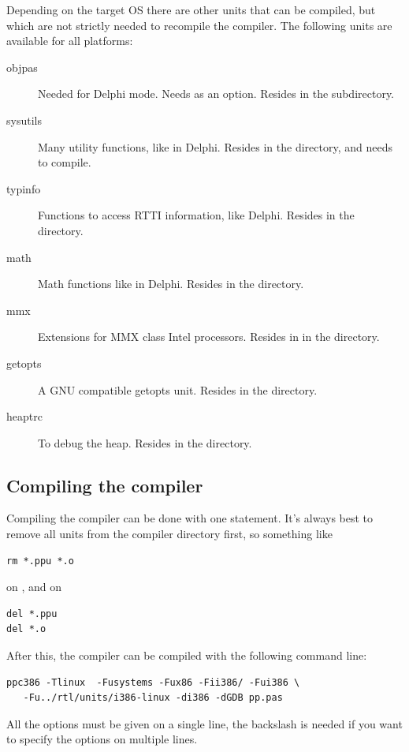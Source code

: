 Depending on the target OS there are other units that can be 
compiled, but which are not strictly needed to recompile the compiler.
The following units are available for all platforms:
\begin{description}
\item[objpas] Needed for Delphi mode. Needs  as an option. Resides
in the  subdirectory.
\item[sysutils] Many utility functions, like in Delphi. Resides in the
 directory, and needs  to compile.
\item[typinfo] Functions to access RTTI information, like Delphi. Resides in
the  directory.
\item[math] Math functions like in Delphi. Resides in the 
directory.
\item[mmx] Extensions for MMX class Intel processors. Resides in
in the  directory.
\item[getopts] A GNU compatible getopts unit. Resides in the 
directory.
\item[heaptrc] To debug the heap. Resides in the  directory.
\end{description}

\subsection{Compiling the compiler}

Compiling the compiler can be done with one statement. It's always best to
remove all units from the compiler directory first, so something like
\begin{verbatim}
rm *.ppu *.o
\end{verbatim}
on \linux, and on \dos
\begin{verbatim}
del *.ppu
del *.o
\end{verbatim}
After this, the compiler can be compiled with the following command line:
\begin{verbatim}
ppc386 -Tlinux  -Fusystems -Fux86 -Fii386/ -Fui386 \
   -Fu../rtl/units/i386-linux -di386 -dGDB pp.pas
\end{verbatim}
All the options must be given on a single line, the backslash is needed if
you want to specify the options on multiple lines.

